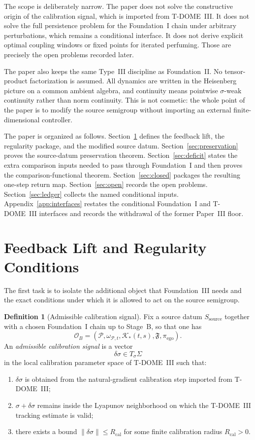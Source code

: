 \documentclass[12pt]{article}
\theoremstyle{definition}
\newtheorem{definition}[theorem]{Definition}
\theoremstyle{remark}
\begin{document}
The scope is deliberately narrow. The paper does not solve the
constructive origin of the calibration signal, which is imported from
T-DOME~III. It does not solve the full persistence problem for the
Foundation~I chain under arbitrary perturbations, which remains a
conditional interface. It does not derive explicit optimal coupling
windows or fixed points for iterated perfuming. Those are precisely the
open problems recorded later.

The paper also keeps the same Type~III discipline as Foundation~II. No
tensor-product factorization is assumed. All dynamics are written in the
Heisenberg picture on a common ambient algebra, and continuity means
pointwise \(\sigma\)-weak continuity rather than norm continuity. This
is not cosmetic: the whole point of the paper is to modify the source
semigroup without importing an external finite-dimensional controller.

The paper is organized as follows. Section~\ref{sec:feedback} defines
the feedback lift, the regularity package, and the modified source
datum. Section~\ref{sec:preservation} proves the source-datum
preservation theorem. Section~\ref{sec:deficit} states the extra
comparison inputs needed to pass through Foundation~I and then proves
the comparison-functional theorem. Section~\ref{sec:closed} packages
the resulting one-step return map. Section~\ref{sec:open} records the
open problems. Section~\ref{sec:ledger} collects the named conditional
inputs. Appendix~\ref{app:interfaces} restates the conditional
Foundation~I and T-DOME~III interfaces and records the withdrawal of the
former Paper~III floor.

\section{Feedback Lift and Regularity Conditions}\label{sec:feedback}

The first task is to isolate the additional object that Foundation~III
needs and the exact conditions under which it is allowed to act on the
source semigroup.

\begin{definition}[Admissible calibration signal]\label{def:signal}
Fix a source datum \(S_{\mathrm{source}}\) together with a chosen
Foundation~I chain up to Stage~B, so that one has
\[
\mathcal O_B
=
(\mathcal P,\omega_{\mathcal P,t},\mathcal K_*(t,s),\mathfrak F,\pi_{\mathrm{ego}}).
\]
An \emph{admissible calibration signal} is a vector
\[
\delta\sigma \in T_\sigma\Sigma
\]
in the local calibration parameter space of T-DOME~III such that:
\begin{enumerate}
\item \(\delta\sigma\) is obtained from the natural-gradient calibration
  step imported from T-DOME~III;
\item \(\sigma+\delta\sigma\) remains inside the Lyapunov neighborhood on
  which the T-DOME~III tracking estimate is valid;
\item there exists a bound
  \(\|\delta\sigma\| \leq R_{\mathrm{cal}}\) for some finite
  calibration radius \(R_{\mathrm{cal}}>0\).
\end{enumerate}
\end{definition}
\end{document}
